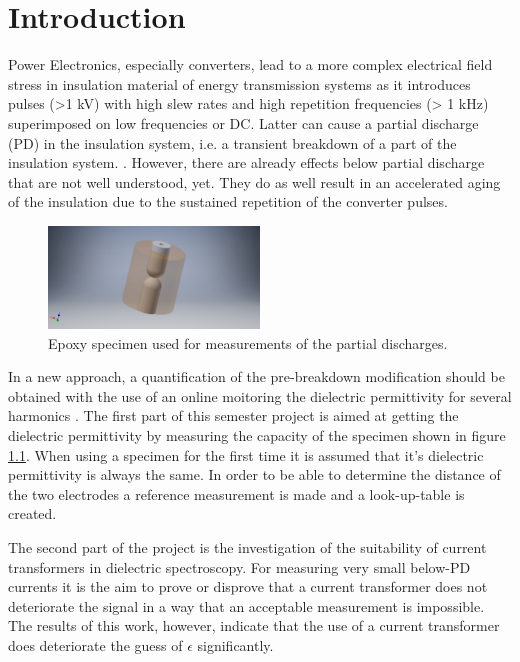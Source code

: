 
\chapter{Introduction}
Power Electronics, especially converters, lead to a more complex electrical field stress in insulation material of energy transmission systems as it introduces pulses (>1 kV) with high slew rates and high repetition frequencies (> 1 kHz) superimposed on low frequencies or DC. Latter can cause a partial discharge (PD) in the insulation system, i.e. a transient breakdown of a part of the insulation system. \cite{TransformerEngineering}. However, there are already effects below partial discharge that are not well understood, yet. They do as well result in an accelerated aging of the insulation due to the sustained repetition of the converter pulses. 
\newline


\begin{figure}[!ht]
  
  
  \centerline{\includegraphics[width=0.5\textwidth]{figures/intro/epoxy_specimen.jpg}}
\caption{Epoxy specimen used for measurements of the partial discharges. \protect\footnotemark}
	\label{fig.specimen}
\end{figure}

In a new approach, a quantification of the pre-breakdown modification should be obtained with the use of an online moitoring the dielectric permittivity for several harmonics \cite{FaerberMVISS}.
The first part of this semester project is aimed at getting the dielectric permittivity by measuring the capacity of the specimen shown in figure \ref{fig.specimen}. When using a specimen for the first time it is assumed that it's dielectric permittivity is always the same. In order to be able to determine the distance of the two electrodes a reference measurement is made and a look-up-table is created. 

The second part of the project is the investigation of the suitability of current transformers in dielectric spectroscopy. For measuring very small below-PD currents it is the aim to prove or disprove that a current transformer does not deteriorate the signal in a way that an acceptable measurement is impossible. The results of this work, however, indicate that the use of a current transformer does deteriorate the guess of $\epsilon$ significantly. 

